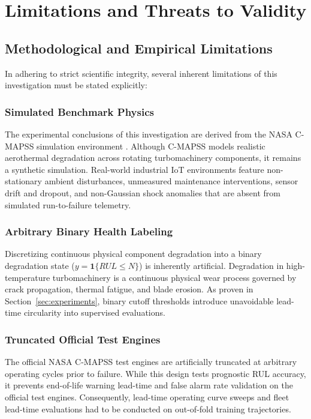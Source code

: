 \section{Limitations and Threats to Validity}
\label{sec:limitations}

\subsection{Methodological and Empirical Limitations}
In adhering to strict scientific integrity, several inherent limitations of this investigation must be stated explicitly:

\subsubsection{Simulated Benchmark Physics}
The experimental conclusions of this investigation are derived from the NASA C-MAPSS simulation environment \cite{saxena2008damage}. Although C-MAPSS models realistic aerothermal degradation across rotating turbomachinery components, it remains a synthetic simulation. Real-world industrial IoT environments feature non-stationary ambient disturbances, unmeasured maintenance interventions, sensor drift and dropout, and non-Gaussian shock anomalies that are absent from simulated run-to-failure telemetry.

\subsubsection{Arbitrary Binary Health Labeling}
Discretizing continuous physical component degradation into a binary degradation state ($y = \mathbf{1}\{RUL \le N\}$) is inherently artificial. Degradation in high-temperature turbomachinery is a continuous physical wear process governed by crack propagation, thermal fatigue, and blade erosion. As proven in Section~\ref{sec:experiments}, binary cutoff thresholds introduce unavoidable lead-time circularity into supervised evaluations.

\subsubsection{Truncated Official Test Engines}
The official NASA C-MAPSS test engines are artificially truncated at arbitrary operating cycles prior to failure. While this design tests prognostic RUL accuracy, it prevents end-of-life warning lead-time and false alarm rate validation on the official test engines. Consequently, lead-time operating curve sweeps and fleet lead-time evaluations had to be conducted on out-of-fold training trajectories.

